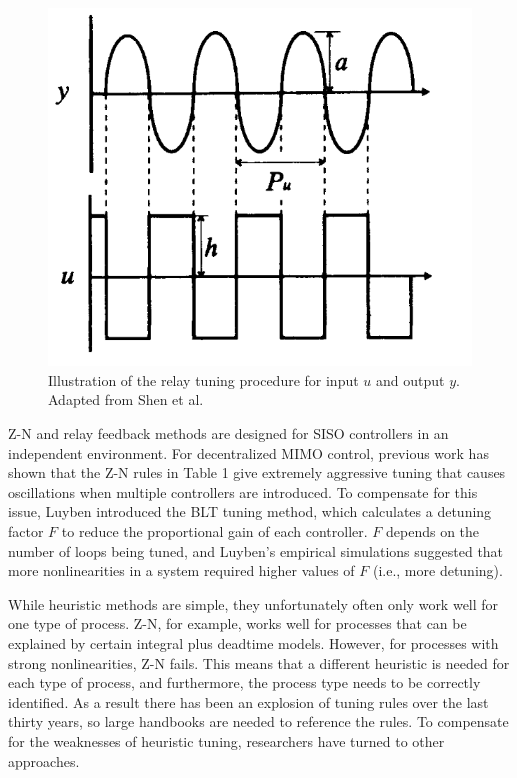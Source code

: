 \begin{figure}[bt]
  \centering
  \includegraphics[scale=0.3]{gfx/Chapter05/relay_tuning.png}
  \caption{Illustration of the relay tuning procedure for input $u$ and output $y$. Adapted from Shen et al.\citep{Shen1994}}
  \label{relay_tuning}
\end{figure}

Z-N and relay feedback methods are designed for SISO controllers in an independent environment. For decentralized MIMO control, previous work has shown that the Z-N rules in Table 1 give extremely aggressive tuning that causes oscillations when multiple controllers are introduced.\citep{Riggs2006} To compensate for this issue, Luyben introduced the BLT tuning method, which calculates a detuning factor $F$ to reduce the proportional gain of each controller.\citep{Luyben1986} $F$ depends on the number of loops being tuned, and Luyben's empirical simulations suggested that more nonlinearities in a system required higher values of $F$ (i.e., more detuning).

While heuristic methods are simple, they unfortunately often only work well for one type of process. Z-N, for example, works well for processes that can be explained by certain integral plus deadtime models.\citep{ODwyer2009} However, for  processes with strong nonlinearities, Z-N fails.\citep{Hang1991} This means that a different heuristic is needed for each type of process, and furthermore, the process type needs to be correctly identified. As a result there has been an explosion of tuning rules over the last thirty years, so large handbooks are needed to reference the rules.\citep{ODwyer2009} To compensate for the weaknesses of heuristic tuning, researchers have turned to other approaches.
 
